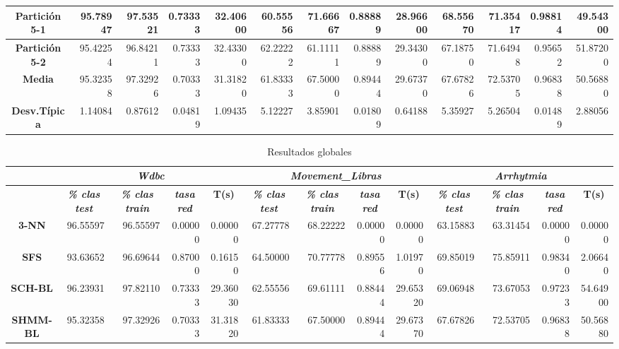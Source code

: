 \documentclass[a4paper,11pt]{article}
\begin{document}
\begin{table}[H]
\begin{adjustbox}{width=1.1\textwidth}
\begin{tabular}{|c|r|r|r|r|r|r|r|r|r|r|r|r|}
  \textbf{Partición 5-1} & 95.78947 & 97.53521 & 0.73333 & 32.40600 & 60.55556 & 71.66667 & 0.88889 & 28.96600 & 68.55670 & 71.35417 & 0.98814 & 49.54300 \\ \hline
  \textbf{Partición 5-2} & 95.42254 & 96.84211 & 0.73333 & 32.43300 & 62.22222 & 61.11111 & 0.88889 & 29.34300 & 67.18750 & 71.64948 & 0.95652 & 51.87200 \\ \hline
  \textbf{Media} & 95.32358 & 97.32926 & 0.70333 & 31.31820 & 61.83333 & 67.50000 & 0.89444 & 29.67370 & 67.67826 & 72.53705 & 0.96838 & 50.56880 \\ \hline
  \textbf{Desv.Típica} & 1.14084 & 0.87612 & 0.04819 & 1.09435 & 5.12227 & 3.85901 & 0.01809 & 0.64188 & 5.35927 & 5.26504 & 0.01489 & 2.88056 \\ \hline
  \end{tabular}
  \end{adjustbox}
  \label{AGE}
  \end{table}
  
  
  
  \begin{table}[H]
  \caption{Resultados globales}
  \begin{adjustbox}{width=1.1\textwidth}
  \begin{tabular}{|c|r|r|r|r|r|r|r|r|r|r|r|r|}
  \hline
  \multicolumn{1}{|l|}{} & \multicolumn{ 4}{c|}{\textbf{\textit{Wdbc}}} & \multicolumn{ 4}{c|}{\textbf{\textit{Movement\_Libras}}} & \multicolumn{ 4}{c|}{\textbf{\textit{Arrhytmia}}} \\ \hline
  \multicolumn{1}{|l|}{} & \multicolumn{1}{c|}{\textbf{\textit{\% clas test}}} & \multicolumn{1}{c|}{\textbf{\textit{\% clas train}}} & \multicolumn{1}{c|}{\textbf{\textit{tasa red}}} & \multicolumn{1}{c|}{\textbf{T(s)}} & \multicolumn{1}{c|}{\textbf{\textit{\% clas test}}} & \multicolumn{1}{c|}{\textbf{\textit{\% clas train}}} & \multicolumn{1}{c|}{\textbf{\textit{tasa red}}} & \multicolumn{1}{c|}{\textbf{T(s)}} & \multicolumn{1}{c|}{\textbf{\textit{\% clas test}}} & \multicolumn{1}{c|}{\textbf{\textit{\% clas train}}} & \multicolumn{1}{c|}{\textbf{\textit{tasa red}}} & \multicolumn{1}{c|}{\textbf{T(s)}} \\ \hline
  \textbf{3-NN} & 96.55597 & 96.55597 & 0.00000 & 0.00000 & 67.27778 & 68.22222 & 0.00000 & 0.00000 & 63.15883 & 63.31454 & 0.00000 & 0.00000 \\ \hline
  \textbf{SFS} & 93.63652 & 96.69644 & 0.87000 & 0.16150 & 64.50000 & 70.77778 & 0.89556 & 1.01970 & 69.85019 & 75.85911 & 0.98340 & 2.06640 \\ \hline
  \textbf{SCH-BL} & 96.23931 & 97.82110 & 0.73333 & 29.36030 & 62.55556 & 69.61111 & 0.88444 & 29.65320 & 69.06948 & 73.67053 & 0.97233 & 54.64900 \\ \hline
  \textbf{SHMM-BL} & 95.32358 & 97.32926 & 0.70333 & 31.31820 & 61.83333 & 67.50000 & 0.89444 & 29.67370 & 67.67826 & 72.53705 & 0.96838 & 50.56880 \\ \hline
  \end{tabular}
  \end{adjustbox}
  \label{all}
  \end{table}
  
\end{document}
